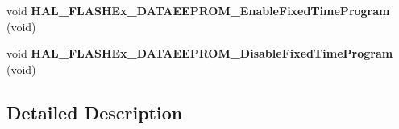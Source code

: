 \begin{DoxyCompactItemize}
\item 
\hypertarget{group___f_l_a_s_h_ex___exported___functions___group3_gaf196e67da2ebfb4373eb0d6232a4f2ba}{void {\bfseries H\-A\-L\-\_\-\-F\-L\-A\-S\-H\-Ex\-\_\-\-D\-A\-T\-A\-E\-E\-P\-R\-O\-M\-\_\-\-Enable\-Fixed\-Time\-Program} (void)}\label{group___f_l_a_s_h_ex___exported___functions___group3_gaf196e67da2ebfb4373eb0d6232a4f2ba}

\item 
\hypertarget{group___f_l_a_s_h_ex___exported___functions___group3_gaf353ffb32f1101493c9eb12c9b498f50}{void {\bfseries H\-A\-L\-\_\-\-F\-L\-A\-S\-H\-Ex\-\_\-\-D\-A\-T\-A\-E\-E\-P\-R\-O\-M\-\_\-\-Disable\-Fixed\-Time\-Program} (void)}\label{group___f_l_a_s_h_ex___exported___functions___group3_gaf353ffb32f1101493c9eb12c9b498f50}

\end{DoxyCompactItemize}


\subsection{Detailed Description}
